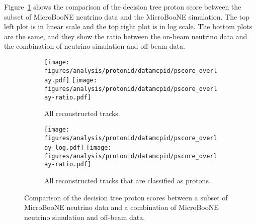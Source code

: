     Figure~\ref{fig:pidscores} shows the comparison of the decision tree proton
    score between the subset of MicroBooNE neutrino data and the MicroBooNE
    simulation. The top left plot is in linear scale and the top right plot is
    in log scale. The bottom plots are the same, and they show the ratio
    between the on-beam neutrino data and the combination of neutrino
    simulation and off-beam data.
    \begin{figure}[h]
      \centering
      \begin{subfigure}[t]{2.8in}
        \texttt{[image: figures/analysis/protonid/datamcpid/pscore\_overlay.pdf]}
        \texttt{[image: figures/analysis/protonid/datamcpid/pscore\_overlay-ratio.pdf]}
        \caption{All reconstructed tracks.}
      \end{subfigure}
      \hspace{2pt}
      \begin{subfigure}[t]{2.8in}
        \texttt{[image: figures/analysis/protonid/datamcpid/pscore\_overlay\_log.pdf]}
        \texttt{[image: figures/analysis/protonid/datamcpid/pscore\_overlay-ratio.pdf]}
        \caption{All reconstructed tracks that are classified as protons.}
      \end{subfigure}
      \caption{Comparison of the decision tree proton scores between a subset
      of MicroBooNE neutrino data and a combination of MicroBooNE neutrino
      simulation and off-beam data.}
      \label{fig:pidscores}
    \end{figure}


